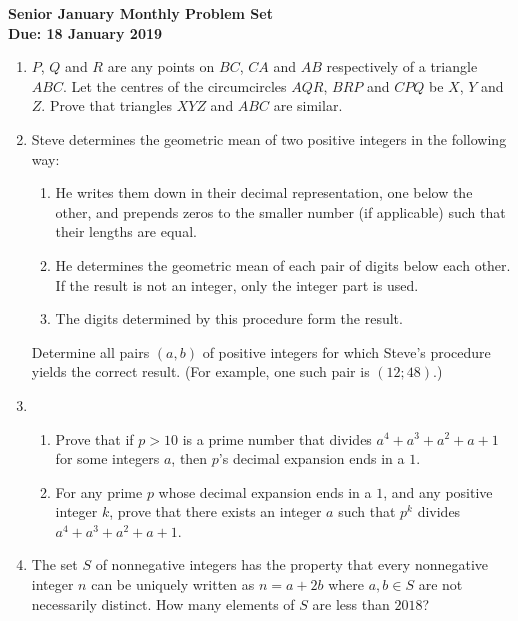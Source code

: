 \documentclass{article}
\begin{document}
\begin{center}
\textbf{\Large Senior January Monthly Problem Set}
\\ \vspace{1em}
\textbf{\large Due: 18 January 2019}
\end{center}

\begin{enumerate}[1.]

\item %
$P$, $Q$ and $R$ are any points on $BC$, $CA$ and $AB$ respectively of a triangle $ABC$. Let the centres of the circumcircles $AQR$, $BRP$ and $CPQ$ be $X$, $Y$ and $Z$. Prove that triangles $XYZ$ and $ABC$ are similar.


\vspace{6pt}
\item %
Steve determines the geometric mean of two positive integers in the following way:
\begin{enumerate}
	\item He writes them down in their decimal representation, one below the other, and prepends zeros to the smaller number (if applicable) such that their lengths are equal.
	\item He determines the geometric mean of each pair of digits below each other. If the result is not an integer, only the integer part is used.
	\item The digits determined by this procedure form the result.
\end{enumerate}
Determine all pairs $(a,b)$ of positive integers for which Steve's procedure yields the correct result. (For example, one such pair is $(12; 48)$.)


\vspace{6pt}
\item %
\begin{enumerate}
	\item Prove that if $p > 10$ is a prime number that divides $a^4+a^3+a^2+a+1$ for some integers $a$, then $p$'s decimal expansion ends in a $1$.
	\item For any prime $p$ whose decimal expansion ends in a $1$, and any positive integer $k$, prove that there exists an integer $a$ such that $p^k$ divides $a^4+a^3+a^2+a+1$.
\end{enumerate}


\vspace{6pt}
\item %
The set $S$ of nonnegative integers has the property that every nonnegative integer $n$ can be uniquely written as $n = a+2b$ where $a,b \in S$ are not necessarily distinct. How many elements of $S$ are less than $2018$?




\end{enumerate}
\end{document}
